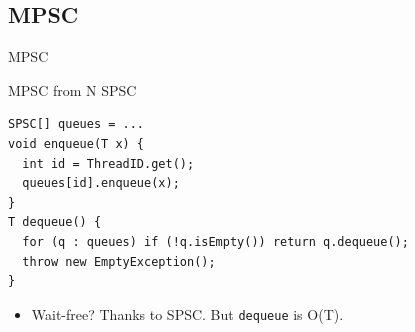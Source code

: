 \subsection{MPSC}
\showTOCSub

\begin{frame}{MPSC}
\end{frame}


\begin{frame}[t,fragile]{MPSC from N SPSC}


\pause

\begin{verbatim}
SPSC[] queues = ...
void enqueue(T x) {
  int id = ThreadID.get();
  queues[id].enqueue(x);
}
T dequeue() {
  for (q : queues) if (!q.isEmpty()) return q.dequeue();
  throw new EmptyException();
}
\end{verbatim}

\begin{itemize}
  \item Wait-free? \pause Thanks to SPSC. \pause But \texttt{dequeue} is O(T).
\end{itemize}

\end{frame}


